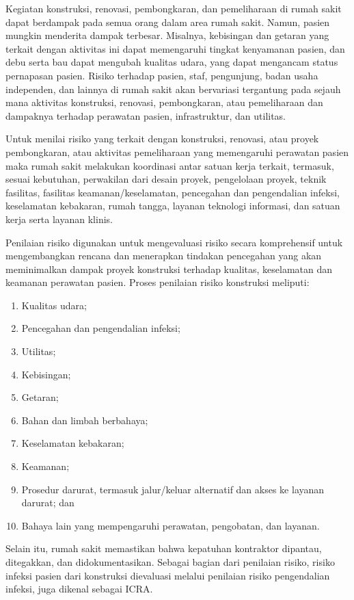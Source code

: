 \documentclass[
]{book}
\providecommand{\tightlist}{%
  \setlength{\itemsep}{0pt}\setlength{\parskip}{0pt}}
\begin{document}
Kegiatan konstruksi, renovasi, pembongkaran, dan pemeliharaan di rumah sakit dapat berdampak pada semua orang dalam area rumah sakit. Namun, pasien mungkin menderita dampak terbesar. Misalnya, kebisingan dan getaran yang terkait dengan aktivitas ini dapat memengaruhi tingkat kenyamanan pasien, dan debu serta bau dapat mengubah kualitas udara, yang dapat mengancam status pernapasan pasien. Risiko terhadap pasien, staf, pengunjung, badan usaha independen, dan lainnya di rumah sakit akan bervariasi tergantung pada sejauh mana aktivitas konstruksi, renovasi, pembongkaran, atau pemeliharaan dan dampaknya terhadap perawatan pasien, infrastruktur, dan utilitas.

Untuk menilai risiko yang terkait dengan konstruksi, renovasi, atau proyek pembongkaran, atau aktivitas pemeliharaan yang memengaruhi perawatan pasien maka rumah sakit melakukan koordinasi antar satuan kerja terkait, termasuk, sesuai kebutuhan, perwakilan dari desain proyek, pengelolaan proyek, teknik fasilitas, fasilitas keamanan/keselamatan, pencegahan dan pengendalian infeksi, keselamatan kebakaran, rumah tangga, layanan teknologi informasi, dan satuan kerja serta layanan klinis.

Penilaian risiko digunakan untuk mengevaluasi risiko secara komprehensif untuk mengembangkan rencana dan menerapkan tindakan pencegahan yang akan meminimalkan dampak proyek konstruksi terhadap kualitas, keselamatan dan keamanan perawatan pasien.
Proses penilaian risiko konstruksi meliputi:

\begin{enumerate}
\def\labelenumi{\alph{enumi}.}
\tightlist
\item
  Kualitas udara;
\item
  Pencegahan dan pengendalian infeksi;
\item
  Utilitas;
\item
  Kebisingan;
\item
  Getaran;
\item
  Bahan dan limbah berbahaya;
\item
  Keselamatan kebakaran;
\item
  Keamanan;
\item
  Prosedur darurat, termasuk jalur/keluar alternatif dan akses ke layanan darurat; dan
\item
  Bahaya lain yang mempengaruhi perawatan, pengobatan, dan layanan.
\end{enumerate}

Selain itu, rumah sakit memastikan bahwa kepatuhan kontraktor dipantau, ditegakkan, dan didokumentasikan. Sebagai bagian dari penilaian risiko, risiko infeksi pasien dari konstruksi dievaluasi melalui penilaian risiko pengendalian infeksi, juga dikenal sebagai ICRA.
\end{document}
